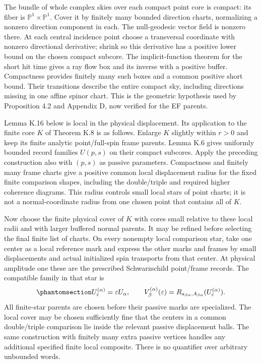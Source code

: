 \documentclass[
  english,
  11pt,
  reqno]{amsart}
\newcounter{none} %
\begin{document}
The bundle of whole complex skies over each compact point core is
compact: its fiber is \(\mathbb P^1\times\mathbb P^1\). Cover it by
finitely many bounded direction charts, normalizing a nonzero direction
component in each. The null-geodesic vector field is nonzero there. At
each central incidence point choose a transversal coordinate with
nonzero directional derivative; shrink so this derivative has a positive
lower bound on the chosen compact subcore. The implicit-function theorem
for the short hit time gives a ray flow box and its inverse with a
positive buffer. Compactness provides finitely many such boxes and a
common positive short bound. Their transitions describe the entire
compact sky, including directions missing in one affine spinor chart.
This is the geometric hypothesis used by Proposition 4.2 and Appendix D,
now verified for the EF parents.

Lemma K.16 below is local in the physical displacement. Its application
to the finite core \(K\) of Theorem K.8 is as follows. Enlarge \(K\)
slightly within \(r>0\) and keep its finite analytic point/full-spin
frame parents. Lemma K.6 gives uniformly bounded record families
\(U(p,s)\) on their compact subcores. Apply the preceding construction
also with \((p,s)\) as passive parameters. Compactness and finitely many
frame charts give a positive common local displacement radius for the
fixed finite comparison shapes, including the double/triple and required
higher coherence diagrams. This radius controls small local stars of
point charts; it is not a normal-coordinate radius from one chosen point
that contains all of \(K\).

Now choose the finite physical cover of \(K\) with cores small relative
to these local radii and with larger buffered normal parents. It may be
refined before selecting the final finite list of charts. On every
nonempty local comparison star, take one center as a local reference
mark and express the other marks and frames by small displacements and
actual initialized spin transports from that center. At physical
amplitude one these are the prescribed Schwarzschild point/frame
records. The compatible family in that star is
\begin{equation}\protect\phantomsection\label{eq:schw-bc-local-star-families}{
 U^{(\alpha)}_\varepsilon=\varepsilon U_\alpha,\qquad
 V^{(\alpha)}_\beta(\varepsilon)
      =R_{a_{\beta\alpha},A_{\beta\alpha}}
                                    (U^{(\alpha)}_\varepsilon).
}\end{equation} All finite-star parents are chosen before their passive
marks are specialized. The local cover may be chosen sufficiently fine
that the centers in a common double/triple comparison lie inside the
relevant passive displacement balls. The same construction with finitely
many extra passive vertices handles any additional specified finite
local composite. There is no quantifier over arbitrary unbounded words.
\end{document}
